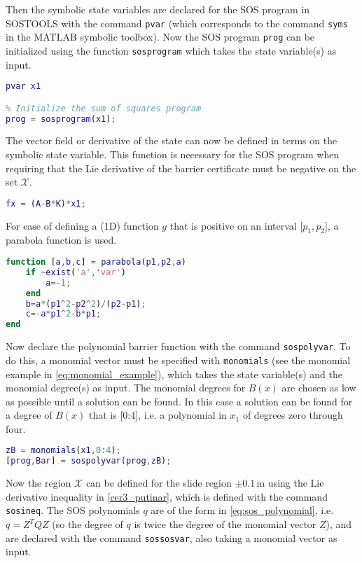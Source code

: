 Then the symbolic state variables are declared for the SOS program in SOSTOOLS with the command \texttt{pvar} (which corresponds to the command \texttt{syms} in the MATLAB symbolic toolbox). Now the SOS program \texttt{prog} can be initialized using the function \texttt{sosprogram} which takes the state variable(s) as input. 
\begin{lstlisting}[language=matlab]
% Declare state variables
pvar x1

% Initialize the sum of squares program
prog = sosprogram(x1);
\end{lstlisting}
The vector field or derivative of the state can now be defined in terms on the symbolic state variable. This function is necessary for the SOS program when requiring that the Lie derivative of the barrier certificate must be negative on the set $\mathcal{X}$.
\begin{lstlisting}[language=matlab]
% Vector field dx/dt = fx (closed loop)
fx = (A-B*K)*x1;
\end{lstlisting}
For ease of defining a (1D) function $g$ that is positive on an interval [$p_1, p_2$], a parabola function is used.
\begin{lstlisting}[language=matlab]
function [a,b,c] = parabola(p1,p2,a)
	if ~exist('a','var')
		a=-1;
	end
	b=a*(p1^2-p2^2)/(p2-p1);
	c=-a*p1^2-b*p1;
end
\end{lstlisting}
Now declare the polynomial barrier function with the command \texttt{sospolyvar}. To do this, a monomial vector must be specified with \texttt{monomials} (see the monomial example in \autoref{eq:monomial_example}), which takes the state variable(s) and the monomial degree(s) as input. The monomial degrees for $B(x)$ are chosen as low as possible until a solution can be found. In this case a solution can be found for a degree of $B(x)$ that is [0:4], i.e. a polynomial in $x_1$ of degrees zero through four.
\begin{lstlisting}[language=matlab]
% Declare the polynomial barrier function
zB = monomials(x1,0:4);
[prog,Bar] = sospolyvar(prog,zB);
\end{lstlisting}
Now the region $\mathcal{X}$ can be defined for the slide region $\pm0.1$\,m using the Lie derivative inequality in \autoref{cer3_putinar}, which is defined with the command \texttt{sosineq}. The SOS polynomials $q$ are of the form in \autoref{eq:sos_polynomial}, i.e. $q=Z^TQZ$ (so the degree of $q$ is twice the degree of the monomial vector $Z$), and are declared with the command \texttt{sossosvar}, also taking a monomial vector as input.

